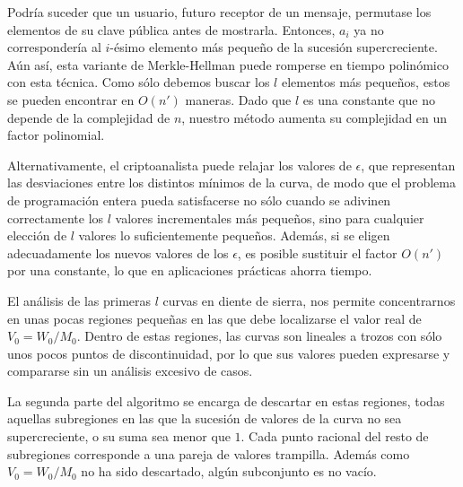     Podría suceder que un usuario, futuro receptor de un mensaje, permutase los elementos de su clave pública antes de mostrarla. Entonces, $a_{i}$ ya no correspondería al $i$-ésimo elemento más pequeño de la sucesión supercreciente. Aún así, esta variante de Merkle-Hellman puede romperse en tiempo polinómico con esta técnica. Como sólo debemos buscar los $l$ elementos más pequeños, estos se pueden encontrar en $O(n')$ maneras. Dado que $l$ es una constante que no depende de la complejidad de $n$, nuestro método aumenta su complejidad en un factor polinomial. 

    Alternativamente, el criptoanalista puede relajar los valores de $\epsilon$, que representan las desviaciones entre los distintos mínimos de la curva, de modo que el problema de programación entera pueda satisfacerse no sólo cuando se adivinen correctamente los $l$ valores incrementales más pequeños, sino para cualquier elección de $l$ valores lo suficientemente pequeños. Además, si se eligen adecuadamente los nuevos valores de los $\epsilon$, es posible sustituir el factor $O(n')$ por una constante, lo que en aplicaciones prácticas ahorra tiempo.

    El análisis de las primeras $l$ curvas en diente de sierra, nos permite concentrarnos en unas pocas regiones pequeñas en las que debe localizarse el valor real de $V_{0} = W_{0}/M_{0}$. Dentro de estas regiones, las curvas son lineales a trozos con sólo unos pocos puntos de discontinuidad, por lo que sus valores pueden expresarse y compararse sin un análisis excesivo de casos.

    La segunda parte del algoritmo se encarga de descartar en estas regiones, todas aquellas subregiones en las que la sucesión de valores de la curva no sea supercreciente, o su suma sea menor que $1$. Cada punto racional del resto de subregiones corresponde a una pareja de valores trampilla. Además como $V_{0} = W_{0}/M_{0}$ no ha sido descartado, algún subconjunto es no vacío.

